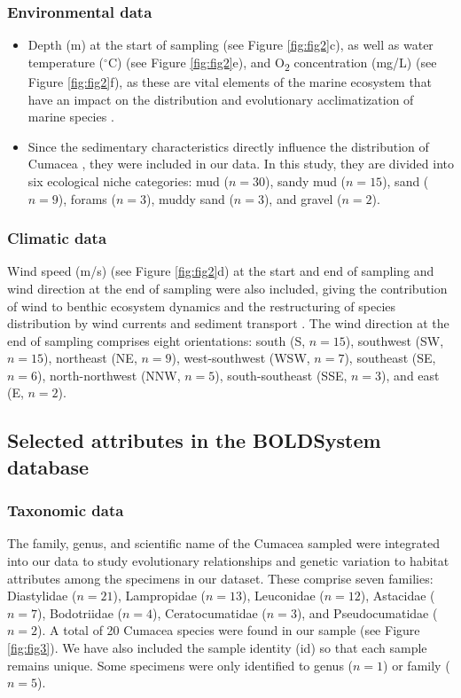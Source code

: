 {\subsubsection{Environmental data} 
\begin{itemize}
\item Depth (m) at the start of sampling (see Figure \ref{fig:fig2}c), as well as water temperature ($^\circ$C) (see Figure \ref{fig:fig2}e), and O\textsubscript{2} concentration (mg/L) (see Figure \ref{fig:fig2}f), as these are vital elements of the marine ecosystem that have an impact on the distribution and evolutionary acclimatization of marine species \citep{rex2006global, danovaro2010first}. 
\item Since the sedimentary characteristics directly influence the distribution of Cumacea \citep{uhlir_adding_2021}, they were included in our data. In this study, they are divided into six ecological niche categories: mud ($n=30$), sandy mud ($n=15$), sand ($n=9$), forams ($n=3$), muddy sand ($n=3$), and gravel ($n=2$).
\end{itemize}

\subsubsection{Climatic data} 
Wind speed (m/s) (see Figure \ref{fig:fig2}d) at the start and end of sampling and wind direction at the end of sampling were also included, giving the contribution of wind to benthic ecosystem dynamics and the restructuring of species distribution by wind currents and sediment transport \citep{siedlecki2016experiments, waga_recent_2020,saeedi_environmental_2022}. The wind direction at the end of sampling comprises eight orientations: south (S, $n=15$), southwest (SW, $n=15$), northeast (NE, $n=9$), west-southwest (WSW, $n=7$), southeast (SE, $n=6$), north-northwest (NNW, $n=5$), south-southeast (SSE, $n=3$), and east (E, $n=2$). 

\subsection{Selected attributes in the BOLDSystem database}
\subsubsection{Taxonomic data} 
The family, genus, and scientific name of the Cumacea sampled were integrated into our data to study evolutionary relationships and genetic variation to habitat attributes among the specimens in our dataset. These comprise seven families: Diastylidae ($n=21$), Lampropidae ($n=13$), Leuconidae ($n=12$), Astacidae ($n=7$), Bodotriidae ($n=4$), Ceratocumatidae ($n=3$), and Pseudocumatidae ($n=2$). A total of 20 Cumacea species were found in our sample (see Figure \ref{fig:fig3}). We have also included the sample identity (id) so that each sample remains unique. Some specimens were only identified to genus ($n=1$) or family ($n=5$).

}

